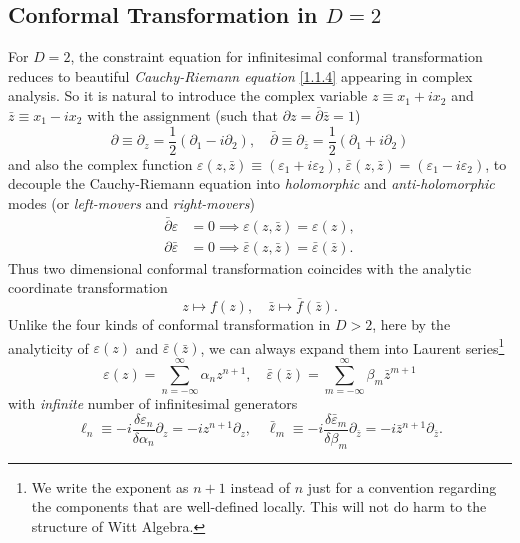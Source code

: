 \documentclass[10pt,nofootinbib]{revtex4}
\begin{document}
	\subsection{Conformal Transformation in $D=2$}
		For $D=2$, the constraint equation for infinitesimal conformal transformation reduces to beautiful \emph{Cauchy-Riemann equation} \eqref{1.1.4} appearing in complex analysis. So it is natural to introduce the complex variable $z\equiv x_1+ix_2$ and $\bar z\equiv x_1-i x_2$ with the assignment (such that $\partial z=\bar\partial\bar z=1$)
		\begin{equation*}
			\partial\equiv\partial_z=\dfrac{1}{2}(\partial_1-i \partial_2),\quad \bar\partial\equiv\partial_{\bar z}=\dfrac{1}{2}(\partial_1+i \partial_2)
		\end{equation*}
		and also the complex function $\varepsilon(z,\bar z)\equiv(\varepsilon_1+i \varepsilon_2)$, $\bar \varepsilon(z,\bar z)=(\varepsilon_1-i \varepsilon_2)$, to decouple the Cauchy-Riemann equation into \emph{holomorphic} and \emph{anti-holomorphic} modes (or \emph{left-movers} and \emph{right-movers})
		\begin{align*}\label{1.2.1}
			\bar \partial \varepsilon&=0\implies \varepsilon(z,\bar z)=\varepsilon(z),\\
			\partial\bar \varepsilon&=0\implies\bar\varepsilon(z,\bar z)=\bar\varepsilon(\bar z).
		\end{align*}
		Thus two dimensional conformal transformation coincides with the analytic coordinate transformation
		\begin{equation*}
			z\mapsto f(z),\quad \bar z\mapsto\bar f(\bar z).
		\end{equation*}
		\indent Unlike the four kinds of conformal transformation in $D>2$, here by the analyticity of $\varepsilon(z)$ and $\bar\varepsilon(\bar z)$, we can always expand them into Laurent series\footnote{We write the exponent as $n+1$ instead of $n$ just for a convention regarding the components that are well-defined locally. This will not do harm to the structure of Witt Algebra.}
		\begin{equation*}
			\varepsilon(z)=\sum_{n=-\infty}^\infty \alpha_n z^{n+1},\quad \bar\varepsilon(\bar z)=\sum_{m=-\infty}^\infty \beta_m \bar{z}^{m+1}
		\end{equation*}
		with \emph{infinite} number of infinitesimal generators
		\begin{equation}\label{1.2.2}
			\ell_n\equiv-i\dfrac{\delta \varepsilon_n}{\delta \alpha_n}\partial_z=-iz^{n+1}\partial_z,\quad\bar\ell_m\equiv-i\dfrac{\delta\bar\varepsilon_m}{\delta \beta_m}\partial_{\bar z}=-i\bar z^{n+1}\partial_{\bar z}.
		\end{equation}
\end{document}
